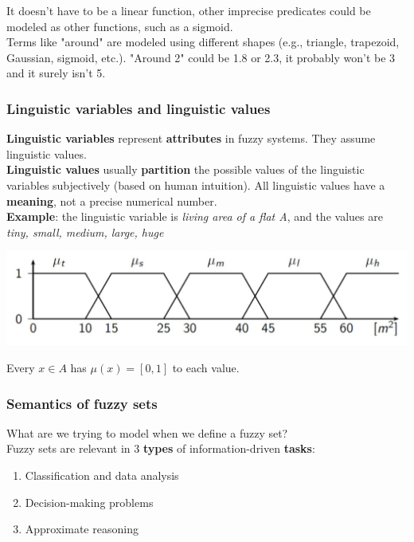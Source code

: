 \documentclass[11pt]{article}
\begin{document}
		It doesn't have to be a linear function, other imprecise predicates could be modeled as other functions, such as a sigmoid.\\
		
		Terms like "around" are modeled using different shapes (e.g., triangle, trapezoid, Gaussian, sigmoid, etc.). "Around 2" could be 1.8 or 2.3, it probably won't be 3 and it surely isn't 5.\\
		
		\newpage
		
		\subsubsection{Linguistic variables and linguistic values}
		
		\textbf{Linguistic variables} represent \textbf{attributes} in fuzzy systems. They assume linguistic values.\\
		
		\textbf{Linguistic values} usually \textbf{partition} the possible values of the linguistic variables subjectively (based on human intuition). All linguistic values have a \textbf{meaning}, not a precise numerical number.\\
		
		\textbf{Example}: the linguistic variable is \textit{living area of a flat A}, and the values are \textit{tiny, small, medium, large, huge}
		\begin{center}
			\includegraphics[width=0.9\columnwidth]{img/FS/living1}
		\end{center}
		Every $x \in A$ has $\mu (x) = [0,1]$ to each value.\\
		
		\newpage
		
		\subsubsection{Semantics of fuzzy sets}
		
		What are we trying to model when we define a fuzzy set?\\
		
		Fuzzy sets are relevant in 3 \textbf{types} of information-driven \textbf{tasks}: 
		\begin{enumerate}
			\item Classification and data analysis
			\item Decision-making problems 
			\item Approximate reasoning
		\end{enumerate}
		
\end{document}

